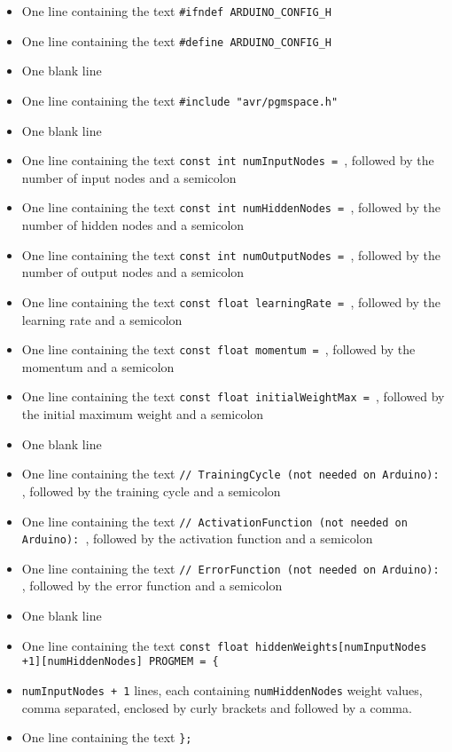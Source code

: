 \documentclass[a4paper]{article}
\begin{document}
\begin{itemize}
\item One line containing the text \lstinline{#ifndef ARDUINO_CONFIG_H}
\item One line containing the text \lstinline{#define ARDUINO_CONFIG_H}
\item One blank line
\item One line containing the text \lstinline{#include "avr/pgmspace.h"}
\item One blank line
\item One line containing the text \lstinline{const int numInputNodes = }, followed by the number of input nodes and a semicolon
\item One line containing the text \lstinline{const int numHiddenNodes = }, followed by the number of hidden nodes and a semicolon
\item One line containing the text \lstinline{const int numOutputNodes = }, followed by the number of output nodes and a semicolon
\item One line containing the text \lstinline{const float learningRate = }, followed by the learning rate and a semicolon
\item One line containing the text \lstinline{const float momentum = }, followed by the momentum and a semicolon
\item One line containing the text \lstinline{const float initialWeightMax = }, followed by the initial maximum weight and a semicolon
\item One blank line
\item One line containing the text \lstinline{// TrainingCycle (not needed on Arduino): }, followed by the training cycle and a semicolon
\item One line containing the text \lstinline{// ActivationFunction (not needed on Arduino): }, followed by the activation function and a semicolon
\item One line containing the text \lstinline{// ErrorFunction (not needed on Arduino): }, followed by the error function and a semicolon
\item One blank line
\item One line containing the text \lstinline|const float hiddenWeights[numInputNodes +1][numHiddenNodes] PROGMEM = {|
\item \lstinline{numInputNodes + 1} lines, each containing \lstinline{numHiddenNodes} weight values, comma separated, enclosed by curly brackets and followed by a comma.
\item One line containing the text \lstinline|};|

\end{itemize}
\end{document}
